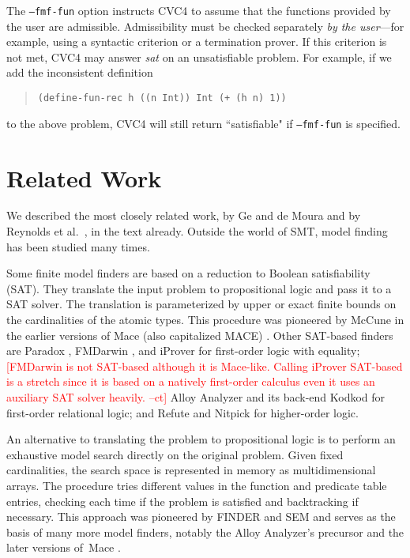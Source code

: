 \documentclass[runningheads,a4paper]{llncs}
\newcommand\cvc{CVC4\xspace}
\newcommand{\rem}[1]{\textcolor{red}{[#1]}}
\newcommand{\ct}[1]{\rem{#1 --ct}}
\begin{document}
The \texttt{--fmf-fun} option instructs \cvc to assume that the
functions provided by the user are admissible.
Admissibility must be checked separately \emph{by the user}---for example, using a
syntactic criterion or a termination prover.
If this criterion is not met, \cvc may answer \emph{sat} on
an unsatisfiable problem. For example, if we add the inconsistent definition
%
\begin{quote}
\small
\begin{verbatim}
(define-fun-rec h ((n Int)) Int (+ (h n) 1))
\end{verbatim}
\end{quote}
%
to the above problem, \cvc will still return ``satisfiable"
if \texttt{--fmf-fun} is specified.


\section{Related Work}

We described the most closely related work, by Ge and de Moura
\cite{GeDeM-CAV-09} and by Reynolds et al.\
\cite{ReyEtAl-1-RR-13,reynolds-et-al-2013}, in the text already.
Outside the world of SMT, model finding has been
studied many times. 

Some finite model finders are based on a reduction to Boolean satisfiability
(SAT). They translate the input problem to propositional logic and pass it to a
SAT solver. The translation is parameterized by upper or exact finite bounds on
the cardinalities of the atomic types. This procedure was pioneered by McCune
in the earlier versions of Mace (also capitalized MACE) \cite{mccune-1994}.
Other SAT-based finders are Paradox \cite{claessen-sorensson-2003}, FMDarwin
\cite{xxxx}, and iProver \cite{xxxx} for first-order logic with equality;
\ct{FMDarwin is not SAT-based although it is Mace-like.
Calling iProver SAT-based is a stretch since it is based 
on a natively first-order calculus even it uses an auxiliary SAT solver heavily.
}
Alloy Analyzer and its back-end Kodkod \cite{torlak-jackson-2007} for
first-order relational logic; and Refute \cite{weber-2008} and Nitpick
\cite{blanchette-nipkow-2010} for higher-order logic.

An alternative to translating the problem to propositional logic is to perform
an exhaustive model search directly on the original problem. Given fixed
cardinalities, the search space is represented in memory as multidimensional
arrays. The procedure tries different values in the function and predicate
table entries, checking each time if the problem is satisfied and backtracking
if necessary. This approach was pioneered by FINDER \cite{slaney-1994} and
SEM \cite{zhang-zhang-1995} and serves as the basis of many more model finders,
notably the Alloy Analyzer's precursor \cite{jackson-1996} and the later
versions of~Mace \cite{mccune-prover9-mace4}.
\end{document}
